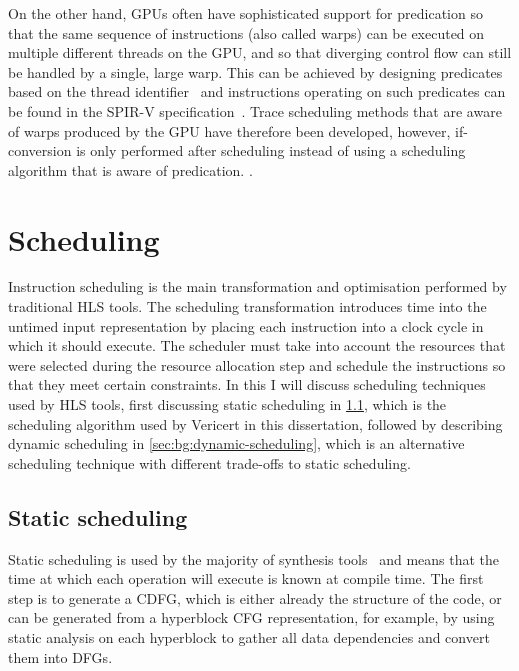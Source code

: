 On the other hand, \glspl{GPU} often have sophisticated support for predication so that the same sequence of instructions (also called warps) can be executed on multiple different threads on the \gls{GPU}, and so that diverging control flow can still be handled by a single, large warp.
This can be achieved by designing predicates based on the thread identifier~\cite{narasiman11_igplw} and instructions operating on such predicates can be found in the SPIR-V specification~\cite[p.~172]{kessenich18_svs}.
Trace scheduling methods that are aware of warps produced by the \gls{GPU} have therefore been developed, however, if-conversion is only performed after scheduling instead of using a scheduling algorithm that is aware of predication.
.

\section{Scheduling}%
\label{sec:bg:scheduling}

Instruction scheduling is the main transformation and optimisation performed by
traditional \gls{HLS} tools.  The scheduling transformation introduces time into
the untimed input representation by placing each instruction into a clock cycle
in which it should execute.  The scheduler must take into account the resources
that were selected during the resource allocation step and schedule the
instructions so that they meet certain constraints.  In this
 I will discuss scheduling techniques used by
\gls{HLS} tools, first discussing static scheduling in
\cref{sec:bg:static-scheduling}, which is the scheduling algorithm used by
Vericert in this dissertation, followed by describing \gls{dynamic scheduling}
in \cref{sec:bg:dynamic-scheduling}, which is an alternative scheduling
technique with different trade-offs to static scheduling.

\subsection{Static scheduling}%
\label{sec:bg:static-scheduling}

Static scheduling is used by the majority of synthesis tools~\cite{canis13_l,
  amd23_vitis_high_synth, mentor20_catap_high_level_synth,
  intel20_sdk_openc_applic, roane23_autom_hw_sw_co_desig} and means that the
time at which each operation will execute is known at compile time.  The first
step is to generate a \gls{CDFG}, which is either already the structure of the
code, or can be generated from a \gls{hyperblock} \gls{CFG} representation, for
example, by using static analysis on each \gls{hyperblock} to gather all data
dependencies and convert them into \glspl{DFG}.

